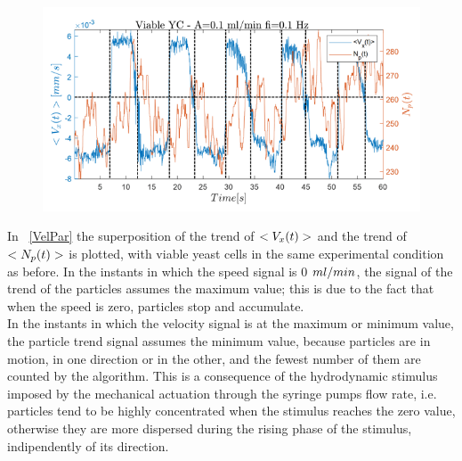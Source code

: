 \documentclass[journal]{IEEEtran}
\theoremstyle{definition}
\theoremstyle{remark}
\begin{document}
\begin{figure}[t]
	\centering
	\includegraphics[width=1\columnwidth]{images/VelPar}
\end{figure}

In ~\fig\ref{VelPar} the superposition of the trend of  $<V_{x}(t)>$ and the trend of $<N_p(t)>$ is plotted, with viable yeast cells in the same experimental condition as before. In the instants in which the speed signal is 0 $ml/min$, the signal of the trend of the particles assumes the maximum value; this is due to the fact that when the speed is zero, particles stop and accumulate.
\\In the instants in which the velocity signal is at the maximum or minimum value, the particle trend signal assumes the minimum value, because particles are in motion, in one direction or in the other, and the fewest number of them are counted by the algorithm. This is a consequence of the hydrodynamic stimulus imposed by the mechanical actuation through the syringe pumps flow rate, i.e. particles tend to be highly concentrated when the stimulus reaches the zero value, otherwise they are more dispersed during the rising phase of the stimulus, indipendently of its direction.
\end{document}
